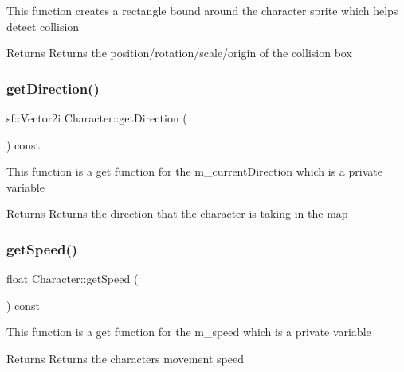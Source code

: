 This function creates a rectangle bound around the character sprite which helps detect collision

\begin{DoxyReturn}{Returns}
Returns the position/rotation/scale/origin of the collision box 
\end{DoxyReturn}
\mbox{\label{class_character_ae8147e847ec305534ef4f2652f3541de}} 
\subsubsection{\texorpdfstring{get\+Direction()}{getDirection()}}
{\footnotesize\ttfamily sf\+::\+Vector2i Character\+::get\+Direction (\begin{DoxyParamCaption}{ }\end{DoxyParamCaption}) const}

This function is a get function for the m\+\_\+current\+Direction which is a private variable

\begin{DoxyReturn}{Returns}
Returns the direction that the character is taking in the map 
\end{DoxyReturn}
\mbox{\label{class_character_afb7791a8c122e8b88244f0a1a54506c0}} 
\subsubsection{\texorpdfstring{get\+Speed()}{getSpeed()}}
{\footnotesize\ttfamily float Character\+::get\+Speed (\begin{DoxyParamCaption}{ }\end{DoxyParamCaption}) const}

This function is a get function for the m\+\_\+speed which is a private variable

\begin{DoxyReturn}{Returns}
Returns the character\textquotesingle{}s movement speed 
\end{DoxyReturn}
\mbox{\label{class_character_a4af2fa47e778a3d8d6be65d728bed4e8}} 
